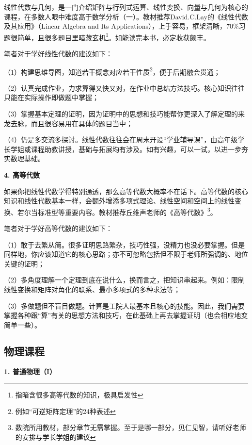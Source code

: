 \documentclass[11pt,oneside]{book}
\begin{document}
线性代数与几何，是一门介绍矩阵与行列式运算、线性变换、向量与几何为核心的课程，在多数人眼中难度高于数学分析（一）。教材推荐David.C.Lay的《线性代数及其应用》（Linear Algebra and Its Applications），上手容易，框架清晰，70\%习题很简单，且很多题目里暗藏玄机\footnote{指暗含很多高等代数的知识，极具启发性}。如能读完本书，必定收获颇丰。

\vspace{10pt}

笔者对于学好线性代数的建议如下：

（1）构建思维导图，知道若干概念对应若干性质\footnote{例如“可逆矩阵定理”的24种表述}，便于后期融会贯通；

（2）认真完成作业，力求算得又快又对，在作业中总结方法技巧。核心知识往往只能在实际操作即做题中掌握；

（3）掌握基本定理的证明，因为证明中的思想和技巧能帮你更深入了解定理的来龙去脉，而且很容易用在具体的题目当中；

（4）仍是多交流多探讨。线性代数往往会在周末开设“学业辅导课”，由高年级学长学姐或课程助教讲授，基础与拓展均有涉及。如有兴趣，可以一试，以进一步夯实数理基础。

\vspace{10pt}

\textbf{4. 高等代数}

如果你把线性代数学得特别通透，那么高等代数大概率不在话下。高等代数的核心知识和线性代数基本一样，会额外增添多项式理论、线性空间和空间上的线性变换、若尔当标准型等重要内容。教材推荐丘维声老师的《高等代数》\footnote{数院所用教材，部分章节无需掌握。至于是哪一部分，见仁见智，请听好老师的安排与学长学姐的建议}。

\vspace{10pt}

笔者对于学好高等代数的建议如下：

（1）敢于去繁从简。很多证明思路繁杂，技巧性强，没精力也没必要掌握。但是同样地，你应该知道它的核心思路；亦不可忽略包括但不限于老师所强调的、地位关键的证明；

（2）多角度理解一个定理到底在说什么，换而言之，把知识串起来。例如：限制线性变换和矩阵对角化的联系、最小多项式的多种求法等；

（3）多做题但不盲目做题。计算是工院人最基本且核心的技能。因此，我们需要掌握各种跟“算”有关的思想方法和技巧，在此基础上再去掌握证明（也会相应地变简单一些）。

\subsection{物理课程}
\textbf{1. 普通物理（I）}
\end{document}
